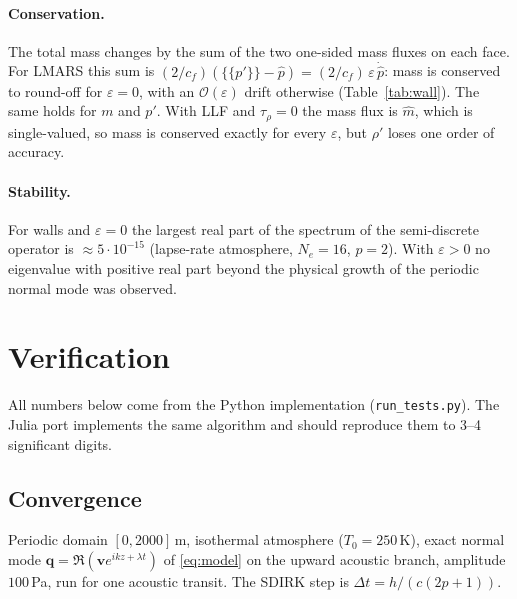 \documentclass[11pt,a4paper]{article}
\newcommand{\avg}[1]{\{\!\{#1\}\!\}}
\newcommand{\q}{\bm q}
\begin{document}
\paragraph{Conservation.} The total mass changes by the sum of the two one-sided mass fluxes on
each face. For LMARS this sum is $(2/c_f)(\avg{p'}-\hat p)=(2/c_f)\,\varepsilon\,\dot{\hat p}$:
mass is conserved to round-off for $\varepsilon=0$, with an $\mathcal O(\varepsilon)$ drift
otherwise (Table~\ref{tab:wall}). The same holds for $m$ and $p'$. With LLF and $\tau_\rho=0$
the mass flux is $\hat m$, which is single-valued, so mass is conserved exactly for every
$\varepsilon$, but $\rho'$ loses one order of accuracy.

\paragraph{Stability.} For walls and $\varepsilon=0$ the largest real part of the spectrum of the
semi-discrete operator is $\approx 5\cdot10^{-15}$ (lapse-rate atmosphere, $N_e=16$, $p=2$). With
$\varepsilon>0$ no eigenvalue with positive real part beyond the physical growth of the periodic
normal mode was observed.

\section{Verification}
All numbers below come from the Python implementation (\texttt{run\_tests.py}). The Julia port
implements the same algorithm and should reproduce them to 3--4 significant digits.

\subsection{Convergence}
Periodic domain $[0,2000]$\,m, isothermal atmosphere ($T_0=250$\,K), exact normal mode
$\q=\Re(\bm v e^{ikz+\lambda t})$ of \eqref{eq:model} on the upward acoustic branch, amplitude
$100$\,Pa, run for one acoustic transit. The SDIRK step is $\Delta t=h/(c(2p+1))$.
\end{document}
